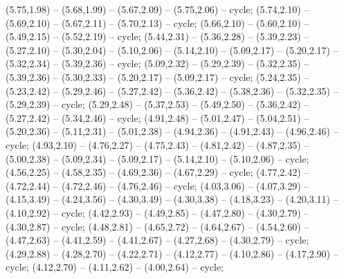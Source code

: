 { (5.75,1.98) -- (5.68,1.99) -- (5.67,2.09) -- (5.75,2.06) -- cycle;
 (5.74,2.10) -- (5.69,2.10) -- (5.67,2.11) -- (5.70,2.13) -- cycle;
 (5.66,2.10) -- (5.60,2.10) -- (5.49,2.15) -- (5.52,2.19) -- cycle;
 (5.44,2.31) -- (5.36,2.28) -- (5.39,2.23) -- (5.27,2.10) -- (5.30,2.04) -- (5.10,2.06) -- (5.14,2.10) -- (5.09,2.17) -- (5.20,2.17) -- (5.32,2.34) -- (5.39,2.36) -- cycle;
 (5.09,2.32) -- (5.29,2.39) -- (5.32,2.35) -- (5.39,2.36) -- (5.30,2.33) -- (5.20,2.17) -- (5.09,2.17) -- cycle;
 (5.24,2.35) -- (5.23,2.42) -- (5.29,2.46) -- (5.27,2.42) -- (5.36,2.42) -- (5.38,2.36) -- (5.32,2.35) -- (5.29,2.39) -- cycle;
 (5.29,2.48) -- (5.37,2.53) -- (5.49,2.50) -- (5.36,2.42) -- (5.27,2.42) -- (5.34,2.46) -- cycle;
 (4.91,2.48) -- (5.01,2.47) -- (5.04,2.51) -- (5.20,2.36) -- (5.11,2.31) -- (5.01,2.38) -- (4.94,2.36) -- (4.91,2.43) -- (4.96,2.46) -- cycle;
 (4.93,2.10) -- (4.76,2.27) -- (4.75,2.43) -- (4.81,2.42) -- (4.87,2.35) -- (5.00,2.38) -- (5.09,2.34) -- (5.09,2.17) -- (5.14,2.10) -- (5.10,2.06) -- cycle;
 (4.56,2.25) -- (4.58,2.35) -- (4.69,2.36) -- (4.67,2.29) -- cycle;
 (4.77,2.42) -- (4.72,2.44) -- (4.72,2.46) -- (4.76,2.46) -- cycle;
 (4.03,3.06) -- (4.07,3.29) -- (4.15,3.49) -- (4.24,3.56) -- (4.30,3.49) -- (4.30,3.38) -- (4.18,3.23) -- (4.20,3.11) -- (4.10,2.92) -- cycle;
 (4.42,2.93) -- (4.49,2.85) -- (4.47,2.80) -- (4.30,2.79) -- (4.30,2.87) -- cycle;
 (4.48,2.81) -- (4.65,2.72) -- (4.64,2.67) -- (4.54,2.60) -- (4.47,2.63) -- (4.41,2.59) -- (4.41,2.67) -- (4.27,2.68) -- (4.30,2.79) -- cycle;
 (4.29,2.88) -- (4.28,2.70) -- (4.22,2.71) -- (4.12,2.77) -- (4.10,2.86) -- (4.17,2.90) -- cycle;
 (4.12,2.70) -- (4.11,2.62) -- (4.00,2.64) -- cycle;
}
